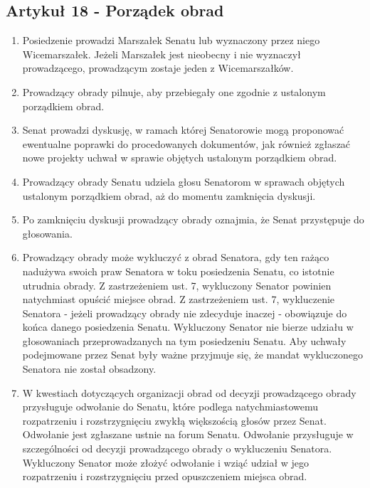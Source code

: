 \documentclass[14pt]{article}
\newenvironment{ustepy}{%
	\begin{enumerate}[leftmargin=1.5em, itemindent=1pt, labelwidth=1em, itemsep=5pt]
	}{%
	\end{enumerate}
}
\begin{document}
\subsection*{Artykuł 18 - Porządek obrad}
\begin{ustepy}
	\item Posiedzenie prowadzi Marszałek Senatu lub wyznaczony przez niego Wicemarszałek. Jeżeli Marszałek jest nieobecny i nie wyznaczył prowadzącego, prowadzącym zostaje jeden z Wicemarszałków.
	\item Prowadzący obrady pilnuje, aby przebiegały one zgodnie z ustalonym porządkiem obrad.
	\item Senat prowadzi dyskusję, w ramach której Senatorowie mogą proponować ewentualne poprawki do procedowanych dokumentów, jak również zgłaszać nowe projekty uchwał w sprawie objętych ustalonym porządkiem obrad. 
	\item Prowadzący obrady Senatu udziela głosu Senatorom w sprawach objętych ustalonym porządkiem obrad, aż do momentu zamknięcia dyskusji. 
	\item Po zamknięciu dyskusji prowadzący obrady oznajmia, że Senat przystępuje do głosowania.
	\item Prowadzący obrady może wykluczyć z obrad Senatora, gdy ten rażąco nadużywa swoich praw Senatora w toku posiedzenia Senatu, co istotnie utrudnia obrady. Z zastrzeżeniem ust. 7, wykluczony Senator powinien natychmiast opuścić miejsce obrad. Z zastrzeżeniem ust. 7, wykluczenie Senatora - jeżeli prowadzący obrady nie zdecyduje inaczej - obowiązuje do końca danego posiedzenia Senatu. Wykluczony Senator nie bierze udziału w głosowaniach przeprowadzanych na tym posiedzeniu Senatu. Aby uchwały podejmowane przez Senat były ważne przyjmuje się, że mandat wykluczonego Senatora nie został obsadzony. 
	\item W kwestiach dotyczących organizacji obrad od decyzji prowadzącego obrady przysługuje odwołanie do Senatu, które podlega natychmiastowemu rozpatrzeniu i rozstrzygnięciu zwykłą większością głosów przez Senat. Odwołanie jest zgłaszane ustnie na forum Senatu. Odwołanie przysługuje w szczególności od decyzji prowadzącego obrady o wykluczeniu Senatora. Wykluczony Senator może złożyć odwołanie i wziąć udział w jego rozpatrzeniu i rozstrzygnięciu przed opuszczeniem miejsca obrad.
\end{ustepy}
\end{document}
